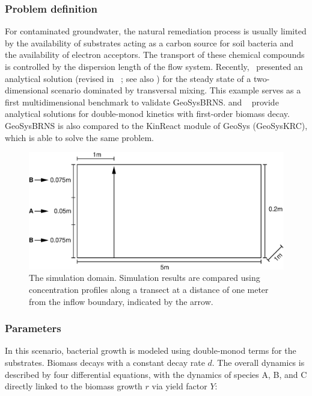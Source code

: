 \subsubsection*{Problem definition}
\label{sec:GS_BRNS_2D}
For contaminated groundwater, the natural remediation process is usually
limited by the availability of substrates acting as a carbon source for
soil bacteria and the availability of electron acceptors. The transport of
these chemical compounds is controlled by the dispersion length of the flow system.
Recently,~\cite{Cirpka:07} presented an analytical solution (revised in ~\cite{Cirpka:09}; see also \cite{ShaoH:08}) for the steady state of a two-dimensional scenario dominated by transversal mixing. This
example serves as a first multidimensional benchmark to validate GeoSysBRNS.
\cite{Cirpka:07} and ~\cite{Cirpka:09} provide analytical solutions for double-monod kinetics with first-order biomass decay. GeoSysBRNS is also compared to the KinReact module of GeoSys (GeoSysKRC), which is able to solve the same problem.

\begin{figure}[th]
\centering
\includegraphics[scale=0.5]{C/figures/monod_domain.eps}
\caption{The simulation domain. Simulation results are compared using concentration profiles along a transect at a distance of one meter from the inflow boundary, indicated by the arrow. } \label{fig:monoddomain}
\end{figure}

\subsubsection*{Parameters}
In this scenario, bacterial growth is modeled using double-monod terms for the substrates. Biomass decays with
a constant decay rate $d$. The overall dynamics is described by four
differential equations, with the dynamics of species A, B, and C directly linked to the biomass growth $r$ via yield factor $Y$:

